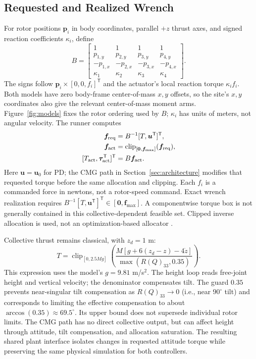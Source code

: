 \documentclass[letterpaper,10pt,conference]{IEEEtran}
\newcommand{\T}{^{\mathsf T}}
\newcommand{\clip}{\operatorname{clip}}
\begin{document}
\subsection{Requested and Realized Wrench}
For rotor positions $\bm p_i$ in body coordinates, parallel $+z$ thrust
axes, and signed reaction coefficients $\kappa_i$, define
\begin{equation}
 B=\begin{bmatrix}
 1&1&1&1\\p_{1,y}&p_{2,y}&p_{3,y}&p_{4,y}\\
 -p_{1,x}&-p_{2,x}&-p_{3,x}&-p_{4,x}\\
 \kappa_1&\kappa_2&\kappa_3&\kappa_4
 \end{bmatrix}.
 \label{eq:allocationmatrix}
\end{equation}
The signs follow $\bm p_i\times[0,0,f_i]\T$ and the actuator's local
reaction torque $\kappa_i f_i$. Both models have zero body-frame
center-of-mass $x,y$ offsets, so the site's $x,y$ coordinates also give
the relevant center-of-mass moment arms. Figure~\ref{fig:models} fixes the
rotor ordering used by $B$; $\kappa_i$ has units of meters, not angular
velocity. The runner computes
\begin{equation}
 \begin{aligned}
 \bm f_{\rm req}&=B^{-1}[T,\bm u\T]\T,\\
 \bm f_{\rm act}&=\clip_{[\bm0,\bm f_{\max}]}(\bm f_{\rm req}),\\
 [T_{\rm act},\bm\tau_{\rm act}\T]\T&=B\bm f_{\rm act}.
 \end{aligned}
 \label{eq:mixer}
\end{equation}
Here $\bm u=\bm u_0$ for PD; the CMG path in Section~\ref{sec:architecture}
modifies that requested torque before the same allocation and clipping.
Each $f_i$ is a commanded force in newtons, not a rotor-speed command.
Exact wrench realization requires
$B^{-1}[T,\bm u\T]\T\in[\bm0,\bm f_{\max}]$.
A componentwise torque box is not generally contained in this
collective-dependent feasible set. Clipped inverse allocation is used,
not an optimization-based allocator \cite{monteiro2016allocation}.

Collective thrust remains classical, with $z_d=1$ m:
\begin{equation}
 T=\clip_{[0,2.5Mg]}
 \left(\frac{M[g+6(z_d-z)-4\dot z]}{\max(R(Q)_{33},0.35)}\right).
 \label{eq:collective}
\end{equation}
This expression uses the model's $g=9.81$ m/s$^2$. The height loop reads
free-joint height and vertical velocity; the denominator compensates tilt.
The guard $0.35$ prevents near-singular tilt compensation as $R(Q)_{33}\to0$
(i.e., near $90^\circ$ tilt) and corresponds to limiting the effective
compensation to about $\arccos(0.35)\approx69.5^\circ$. Its upper bound does
not supersede individual rotor limits. The CMG path has no direct collective
output, but can affect height through attitude, tilt compensation, and
allocation saturation.
The resulting shared plant interface isolates changes in requested
attitude torque while preserving the same physical simulation for both
controllers.
\end{document}
